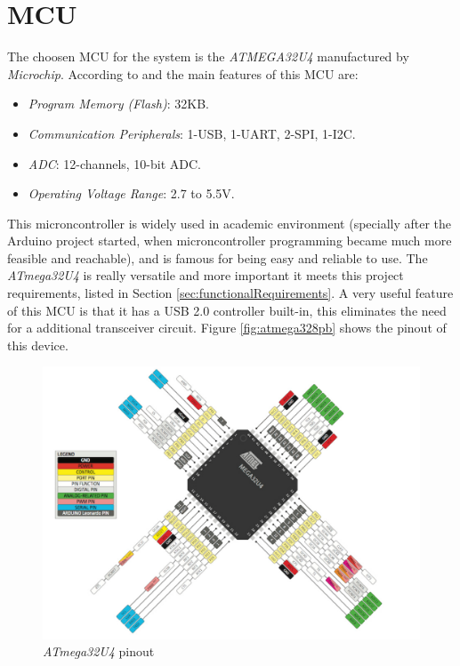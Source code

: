 \section{MCU}\label{sec:mcu-hw}

	The choosen MCU for the system is the \textit{ATMEGA32U4} manufactured by \textit{Microchip}. According to \cite{atmega32u4-features} and \cite{atmega32u4-datasheet} the main features of this MCU are:
		\begin{itemize}
			\item{\textit{Program Memory (Flash)}}: 32KB.\label{itm:program-memory-flash}
			\item{\textit{Communication Peripherals}}: 1-USB, 1-UART, 2-SPI, 1-I2C.\label{itm:communication-peripherals}
			\item{\textit{ADC}}: 12-channels, 10-bit ADC.\label{itm:hw-mcu-adc}
			\item{\textit{Operating Voltage Range}}: 2.7 to 5.5V.\label{itm:operating-voltage-range}
		\end{itemize}
	\par
	This microncontroller is widely used in academic environment (specially after the Arduino project started, when microncontroller programming became much more feasible and reachable), and is famous for being easy and reliable to use. The \textit{ATmega32U4} is really versatile and more important it meets this project requirements, listed in Section \ref{sec:functionalRequirements}. A very useful feature of this MCU is that it has a USB 2.0 controller built-in, this eliminates the need for a additional transceiver circuit. Figure \ref{fig:atmega328pb} shows the pinout of this device.

	\begin{figure}[htbp]
		\centering
		\includegraphics[scale=0.7]{figuras/fig-atmega32u4-pinout.png}
		\caption{\textit{ATmega32U4} pinout \cite{atmega32u4-pinout}}
		\label{fig:atmega32u4-pinout}
	\end{figure}
		

